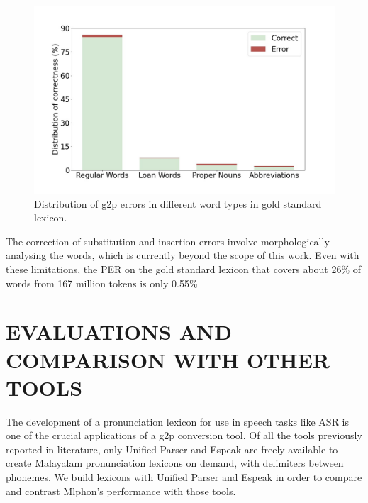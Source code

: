 \documentclass{ieeeaccess}
\begin{document}
\begin{figure}[h]
    \centering
    \includegraphics[width=\linewidth]{g2p-error.jpg}
    \caption{Distribution of g2p errors in different word types in gold standard lexicon.}
    \label{g2p-error}
\end{figure}






The correction of substitution and insertion errors involve morphologically analysing the words, which is currently beyond the scope of this work. Even with these limitations, the PER on the gold standard lexicon that covers about 26\% of words from 167 million tokens is only 0.55\% 



\section{EVALUATIONS AND COMPARISON WITH OTHER TOOLS}
\label{asr}

The development of a pronunciation lexicon for use in speech tasks like ASR is one of the crucial applications of a g2p conversion tool. Of all the tools previously reported in literature, only Unified Parser and Espeak  are freely available to create Malayalam pronunciation lexicons on demand, with delimiters between phonemes. We build lexicons with Unified Parser and Espeak in order to compare and contrast Mlphon's performance with those tools. 
\end{document}
